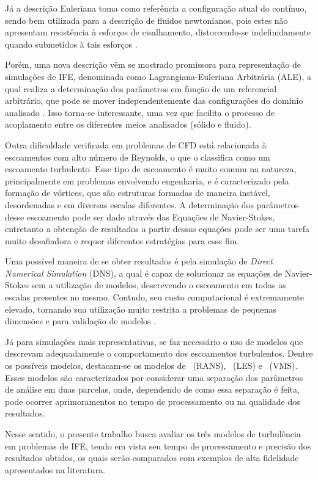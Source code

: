 \documentclass[_ArquivoPrincipal.tex]{subfiles}
\begin{document}
Já a descrição Euleriana toma como referência a configuração atual do contínuo, sendo bem utilizada para a descrição de fluidos newtonianos, pois estes não apresentam resistência à esforços de cisalhamento, distorcendo-se indefinidamente quando submetidos à tais esforços \cite{sanches2014fluid, fernandes2019ale}.

Porém, uma nova descrição vêm se mostrado promissora para representação de simulações de IFE, denominada como Lagrangiana-Euleriana Arbitrária (ALE), a qual realiza a determinação dos parâmetros em função de um referencial arbitrário, que pode se mover independentemente das configurações do domínio analisado \cite{donea1982arbitrary}. Isso torna-se interessante, uma vez que facilita o processo de acoplamento entre os diferentes meios analisados (sólido e fluido).

Outra dificuldade verificada em problemas de CFD está relacionada à escoamentos com alto número de Reynolds, o que o classifica como um escoamento turbulento. Esse tipo de escoamento é muito comum na natureza, principalmente em problemas envolvendo engenharia, e é caracterizado pela formação de vórtices, que são estruturas formadas de maneira instável, desordenadas e em diversas escalas diferentes. A determinação dos parâmetros desse escoamento pode ser dado através das Equações de Navier-Stokes, entretanto a obtenção de resultados a partir dessas equações pode ser uma tarefa muito desafiadora e requer diferentes estratégias para esse fim.

Uma possível maneira de se obter resultados é pela simulação de \textit{Direct Numerical Simulation} (DNS), a qual é capaz de solucionar as equações de Navier-Stokes sem a utilização de modelos, descrevendo o escoamento em todas as escalas presentes no mesmo. Contudo, seu custo computacional é extremamente elevado, tornando sua utilização muito restrita a problemas de pequenas dimensões e para validação de modelos \cite{olad2022towards}.

Já para simulações mais representativas, se faz necessário o uso de modelos que descrevam adequadamente o comportamento dos escoamentos turbulentos. Dentre os possíveis modelos, destacam-se os modelos de \RANS\ (RANS), \LES\ (LES) e \VMS\ (VMS). Esses modelos são caracterizados por considerar uma separação dos parâmetros de análise em duas parcelas, onde, dependendo de como essa separação é feita, pode ocorrer aprimoramentos no tempo de processamento ou na qualidade dos resultados.

Nesse sentido, o presente trabalho busca avaliar os três modelos de turbulência em problemas de IFE, tendo em vista seu tempo de processamento e precisão dos resultados obtidos, os quais serão comparados com exemplos de alta fidelidade apresentados na literatura.
\end{document}
